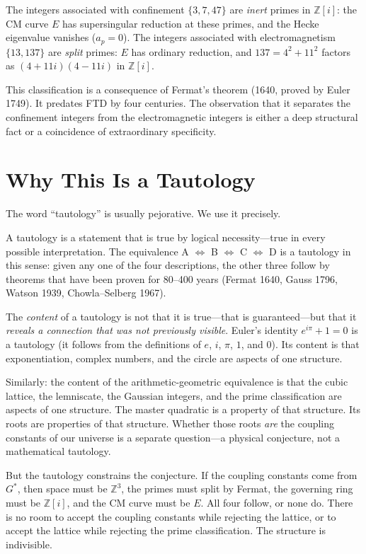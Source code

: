 \documentclass[12pt]{article}
\theoremstyle{definition}
\theoremstyle{remark}
\begin{document}
The integers associated with confinement $\{3, 7, 47\}$ are \emph{inert} primes in $\mathbb{Z}[i]$: the CM curve $E$ has supersingular reduction at these primes, and the Hecke eigenvalue vanishes ($a_p = 0$). The integers associated with electromagnetism $\{13, 137\}$ are \emph{split} primes: $E$ has ordinary reduction, and $137 = 4^2 + 11^2$ factors as $(4+11i)(4-11i)$ in $\mathbb{Z}[i]$.

This classification is a consequence of Fermat's theorem (1640, proved by Euler 1749). It predates FTD by four centuries. The observation that it separates the confinement integers from the electromagnetic integers is either a deep structural fact or a coincidence of extraordinary specificity.

\section{Why This Is a Tautology}
\label{sec:tautology}

The word ``tautology'' is usually pejorative. We use it precisely.

A tautology is a statement that is true by logical necessity---true in every possible interpretation. The equivalence A $\Leftrightarrow$ B $\Leftrightarrow$ C $\Leftrightarrow$ D is a tautology in this sense: given any one of the four descriptions, the other three follow by theorems that have been proven for 80--400 years (Fermat 1640, Gauss 1796, Watson 1939, Chowla--Selberg 1967).

The \emph{content} of a tautology is not that it is true---that is guaranteed---but that it \emph{reveals a connection that was not previously visible}. Euler's identity $e^{i\pi} + 1 = 0$ is a tautology (it follows from the definitions of $e$, $i$, $\pi$, $1$, and $0$). Its content is that exponentiation, complex numbers, and the circle are aspects of one structure.

Similarly: the content of the arithmetic-geometric equivalence is that the cubic lattice, the lemniscate, the Gaussian integers, and the prime classification are aspects of one structure. The master quadratic is a property of that structure. Its roots are properties of that structure. Whether those roots \emph{are} the coupling constants of our universe is a separate question---a physical conjecture, not a mathematical tautology.

But the tautology constrains the conjecture. If the coupling constants come from $G^*$, then space must be $\mathbb{Z}^3$, the primes must split by Fermat, the governing ring must be $\mathbb{Z}[i]$, and the CM curve must be $E$. All four follow, or none do. There is no room to accept the coupling constants while rejecting the lattice, or to accept the lattice while rejecting the prime classification. The structure is indivisible.
\end{document}
